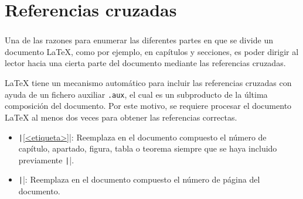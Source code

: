\section{Referencias cruzadas}

\begin{frame}
	\frametitle{}

	Una de las razones para enumerar las diferentes partes en que se divide un documento \LaTeX,
	como por ejemplo, en capítulos y secciones, es poder dirigir al lector hacia una cierta
	parte del documento mediante las \alert{referencias cruzadas}.

	\LaTeX{} tiene un mecanismo automático para incluir las referencias cruzadas con ayuda de un fichero
	auxiliar \texttt{.aux}, el cual es un subproducto de la última composición del documento.
	Por este motivo, se requiere procesar el documento \LaTeX{} al menos dos veces para obtener las referencias
	correctas.

	\begin{itemize}
		\item
		      \texttt|\ref{<etiqueta>}|: Reemplaza en el documento compuesto el número de capítulo, apartado, figura, tabla o teorema
		      siempre que se haya incluido previamente \texttt|\label{<etiqueta>}|.

		\item

		      \texttt|\pageref{<etiqueta>}|: Reemplaza en el documento compuesto el número de página del documento.
	\end{itemize}
\end{frame}

